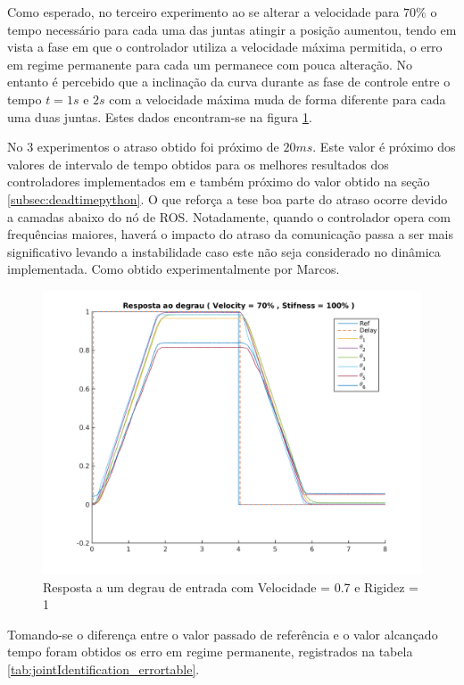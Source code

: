Como esperado, no terceiro experimento ao se alterar a velocidade para $70\%$ o tempo necessário para cada uma das juntas atingir a posição aumentou, tendo em vista a fase em que o controlador utiliza a velocidade máxima permitida, o erro em regime permanente para cada um permanece com pouca alteração. No entanto é percebido que a inclinação da curva durante as fase de controle entre o tempo $t=1s$ e $2s$ com a velocidade máxima muda de forma diferente para cada uma duas juntas. Estes dados encontram-se na figura \ref{fig:jointIdentification_exp3v70v100}.

No 3 experimentos o atraso obtido foi próximo de $20ms$. Este valor é próximo dos valores de intervalo de tempo obtidos para os melhores resultados dos controladores implementados em \cite{marcosps2016} e também próximo do valor obtido na seção \ref{subsec:deadtimepython}. O que reforça a tese boa parte do atraso ocorre devido a camadas abaixo do nó de ROS. Notadamente, quando o controlador opera com frequências maiores, haverá o impacto do atraso da comunicação passa a ser mais significativo levando a instabilidade caso este não seja considerado no dinâmica implementada. Como obtido experimentalmente por Marcos.

\begin{figure}[H]
    \centering
    \includegraphics[width=0.8\linewidth]{tex/figs/jointIdentification_exp3v70v100.png}
    \caption{Resposta a um degrau de entrada com Velocidade = 0.7 e Rigidez = 1}
    \label{fig:jointIdentification_exp3v70v100}
\end{figure}


Tomando-se o diferença entre o valor passado de referência e o valor alcançado tempo foram obtidos os erro em regime permanente, registrados na tabela \ref{tab:jointIdentification_errortable}.

